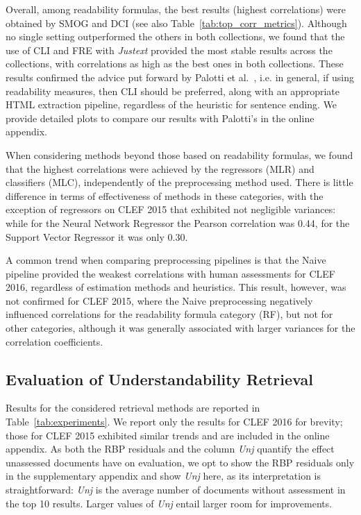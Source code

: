 Overall, among readability formulas, the best results (highest correlations) were obtained by SMOG and DCI (see also Table~\ref{tab:top_corr_metrics}). Although no single setting outperformed the others in both collections, we found that the use of CLI and FRE with \textit{Justext} provided the most stable results across the collections, with correlations as high as the best ones in both collections.
These results confirmed the advice put forward by Palotti et al.~\cite{palotti15}, i.e. in general, if using readability measures, then CLI should be preferred, along with an appropriate HTML extraction pipeline, regardless of the heuristic for sentence ending. We provide detailed plots to compare our results with Palotti's in the online appendix.

When considering methods beyond those based on readability formulas, we found that the highest correlations were achieved by the regressors (MLR) and classifiers (MLC), independently of the preprocessing method used. There is little difference in terms of effectiveness of methods in these categories, with the exception of regressors on CLEF 2015 that exhibited not negligible variances: while for the Neural Network Regressor the Pearson correlation was 0.44, for the Support Vector Regressor it was only 0.30.

A common trend when comparing preprocessing pipelines is that the Naive pipeline provided the weakest correlations with human assessments for CLEF 2016, regardless of estimation methods and heuristics. This result, however, was not confirmed for CLEF 2015, where the Naive preprocessing negatively influenced correlations for the readability formula category (RF), but not for other categories, although it was generally associated with larger variances for the correlation coefficients.


\subsection*{Evaluation of Understandability Retrieval}
\label{sec:results}


%


Results for the considered retrieval methods are reported in Table~\ref{tab:experiments}. We report only the results for CLEF 2016 for brevity; those for CLEF 2015 exhibited similar trends and are included in the online appendix. 
As both the RBP residuals and the column \textit{Unj} quantify the effect unassessed documents have on evaluation, we opt to show the RBP residuals only in the supplementary appendix and show \textit{Unj} here, as its interpretation is straightforward: \textit{Unj} is the average number of documents without assessment in the top 10 results. Larger values of \textit{Unj} entail larger room for improvements.

